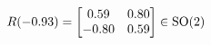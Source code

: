 \documentclass[preview]{standalone}
\begin{document}
\begin{align*}
\special{dvisvgm:raw <g id='unique000'>}R(-0.93) = \begin{bmatrix} 0.59 & 0.80 \\ -0.80 & 0.59 \end{bmatrix} \in \text{SO}(2)\special{dvisvgm:raw </g>}
\end{align*}
\end{document}

